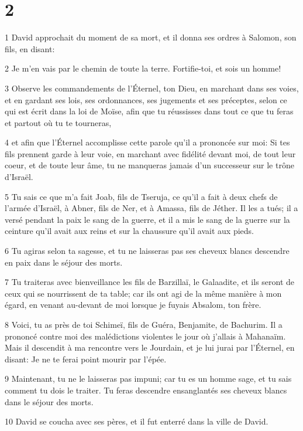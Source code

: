 \chapter{2}

\par 1 David approchait du moment de sa mort, et il donna ses ordres à Salomon, son fils, en disant:
\par 2 Je m'en vais par le chemin de toute la terre. Fortifie-toi, et sois un homme!
\par 3 Observe les commandements de l'Éternel, ton Dieu, en marchant dans ses voies, et en gardant ses lois, ses ordonnances, ses jugements et ses préceptes, selon ce qui est écrit dans la loi de Moïse, afin que tu réussisses dans tout ce que tu feras et partout où tu te tourneras,
\par 4 et afin que l'Éternel accomplisse cette parole qu'il a prononcée sur moi: Si tes fils prennent garde à leur voie, en marchant avec fidélité devant moi, de tout leur coeur, et de toute leur âme, tu ne manqueras jamais d'un successeur sur le trône d'Israël.
\par 5 Tu sais ce que m'a fait Joab, fils de Tseruja, ce qu'il a fait à deux chefs de l'armée d'Israël, à Abner, fils de Ner, et à Amassa, fils de Jéther. Il les a tués; il a versé pendant la paix le sang de la guerre, et il a mis le sang de la guerre sur la ceinture qu'il avait aux reins et sur la chaussure qu'il avait aux pieds.
\par 6 Tu agiras selon ta sagesse, et tu ne laisseras pas ses cheveux blancs descendre en paix dans le séjour des morts.
\par 7 Tu traiteras avec bienveillance les fils de Barzillaï, le Galaadite, et ils seront de ceux qui se nourrissent de ta table; car ils ont agi de la même manière à mon égard, en venant au-devant de moi lorsque je fuyais Absalom, ton frère.
\par 8 Voici, tu as près de toi Schimeï, fils de Guéra, Benjamite, de Bachurim. Il a prononcé contre moi des malédictions violentes le jour où j'allais à Mahanaïm. Mais il descendit à ma rencontre vers le Jourdain, et je lui jurai par l'Éternel, en disant: Je ne te ferai point mourir par l'épée.
\par 9 Maintenant, tu ne le laisseras pas impuni; car tu es un homme sage, et tu sais comment tu dois le traiter. Tu feras descendre ensanglantés ses cheveux blancs dans le séjour des morts.
\par 10 David se coucha avec ses pères, et il fut enterré dans la ville de David.
